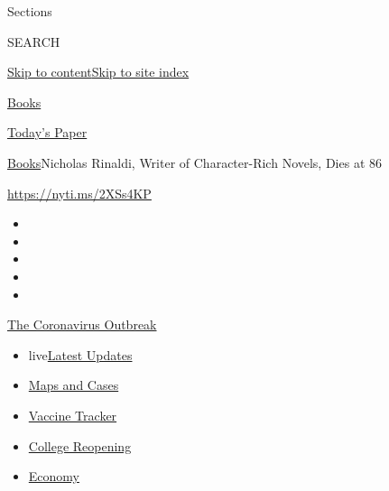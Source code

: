 Sections

SEARCH

\protect\hyperlink{site-content}{Skip to
content}\protect\hyperlink{site-index}{Skip to site index}

\href{https://www.nytimes.com/section/books}{Books}

\href{https://myaccount.nytimes.com/auth/login?response_type=cookie\&client_id=vi}{}

\href{https://www.nytimes.com/section/todayspaper}{Today's Paper}

\href{/section/books}{Books}\textbar{}Nicholas Rinaldi, Writer of
Character-Rich Novels, Dies at 86

\url{https://nyti.ms/2XSs4KP}

\begin{itemize}
\item
\item
\item
\item
\item
\end{itemize}

\href{https://www.nytimes.com/news-event/coronavirus?action=click\&pgtype=Article\&state=default\&region=TOP_BANNER\&context=storylines_menu}{The
Coronavirus Outbreak}

\begin{itemize}
\tightlist
\item
  live\href{https://www.nytimes.com/2020/08/03/world/coronavirus-covid-19.html?action=click\&pgtype=Article\&state=default\&region=TOP_BANNER\&context=storylines_menu}{Latest
  Updates}
\item
  \href{https://www.nytimes.com/interactive/2020/us/coronavirus-us-cases.html?action=click\&pgtype=Article\&state=default\&region=TOP_BANNER\&context=storylines_menu}{Maps
  and Cases}
\item
  \href{https://www.nytimes.com/interactive/2020/science/coronavirus-vaccine-tracker.html?action=click\&pgtype=Article\&state=default\&region=TOP_BANNER\&context=storylines_menu}{Vaccine
  Tracker}
\item
  \href{https://www.nytimes.com/2020/08/02/us/covid-college-reopening.html?action=click\&pgtype=Article\&state=default\&region=TOP_BANNER\&context=storylines_menu}{College
  Reopening}
\item
  \href{https://www.nytimes.com/live/2020/08/03/business/stock-market-today-coronavirus?action=click\&pgtype=Article\&state=default\&region=TOP_BANNER\&context=storylines_menu}{Economy}
\end{itemize}


